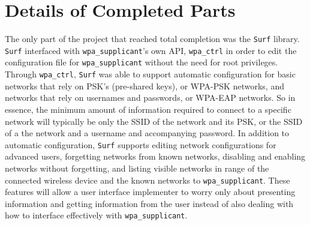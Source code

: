 \documentclass[11pt]{article}
\begin{document}
\section*{Details of Completed Parts}
The only part of the project that reached total completion was the 
\texttt{Surf} library.
\texttt{Surf} interfaced with \texttt{wpa\_supplicant}'s own API, \texttt{wpa\_ctrl}
in order to edit the configuration file for \texttt{wpa\_supplicant} without the need
for root privileges.
Through \texttt{wpa\_ctrl}, \texttt{Surf} was able to support automatic configuration
for basic networks that rely on PSK's (pre-shared keys), or WPA-PSK networks,
and networks that rely on usernames and passwords, or WPA-EAP networks.
So in essence, the minimum amount of information required to connect to a specific 
network will typically be only the SSID of the network and its PSK, or the SSID
of a the network and a username and accompanying password.
In addition to automatic configuration, \texttt{Surf} supports editing network
configurations for advanced users, forgetting networks from known networks,
disabling and enabling networks without forgetting, and listing visible networks
in range of the connected wireless device and the known networks to \texttt{wpa\_supplicant}.
These features will allow a user interface implementer to worry only about presenting
information and getting information from the user instead of also dealing with
how to interface effectively with \texttt{wpa\_supplicant}.\\
\end{document}
